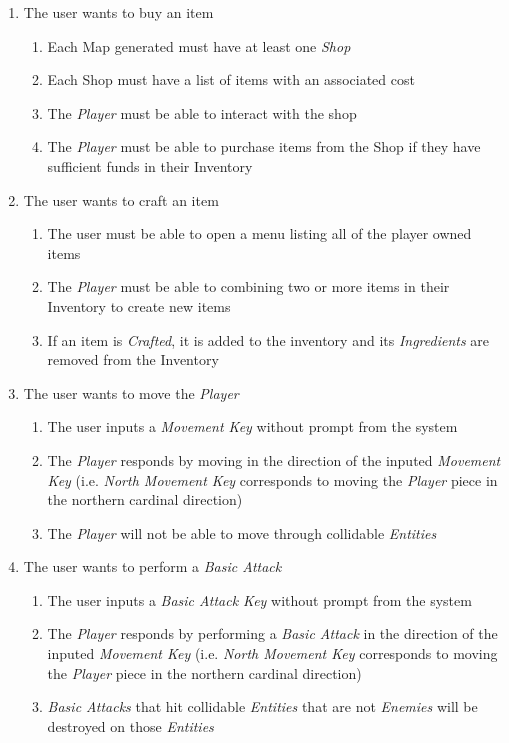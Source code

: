 \documentclass[12pt, titlepage]{article}
\begin{document}
\begin{enumerate}[{VP}1.]
\begin{enumerate}[{BE1}.1]
    \item The user wants to buy an item
    \begin{enumerate}
      \item Each Map generated must have at least one \textit{Shop}
      \item Each Shop must have a list of items with an associated cost
      \item The \textit{Player} must be able to interact with the shop
      \item The \textit{Player} must be able to purchase items from the Shop if they have sufficient funds in their Inventory
    \end{enumerate}

    \item The user wants to craft an item
    \begin{enumerate}
      \item The user must be able to open a menu listing all of the player owned items
      \item The \textit{Player} must be able to combining two or more items in their Inventory to create new items
      \item If an item is \textit{Crafted}, it is added to the inventory and its \textit{Ingredients} are removed from the Inventory
    \end{enumerate}

    \item The user wants to move the \textit{Player}
    \begin{enumerate}
      \item The user inputs a \textit{Movement Key} without prompt from the system
      \item The \textit{Player} responds by moving in the direction of the inputed \textit{Movement Key} (i.e. \textit{North Movement Key} corresponds to moving the \textit{Player} piece in the northern cardinal direction)
      \item The \textit{Player} will not be able to move through collidable \textit{Entities}
    \end{enumerate}

    \item The user wants to perform a \textit{Basic Attack}
    \begin{enumerate}
      \item The user inputs a \textit{Basic Attack Key} without prompt from the system
      \item The \textit{Player} responds by performing a \textit{Basic Attack} in the direction of the inputed \textit{Movement Key} (i.e. \textit{North Movement Key} corresponds to moving the \textit{Player} piece in the northern cardinal direction)
      \item \textit{Basic Attacks} that hit collidable \textit{Entities} that are not \textit{Enemies} will be destroyed on those \textit{Entities}
    \end{enumerate}


\end{enumerate}
\end{enumerate}
\end{document}
